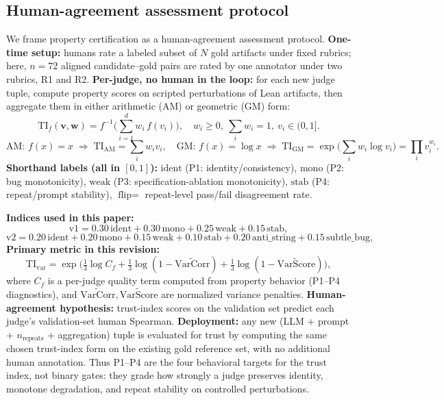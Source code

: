 \documentclass{article}
\begin{document}
\subsection{Human-agreement assessment protocol}
We frame property certification as a human-agreement assessment protocol.
\textbf{One-time setup:} humans rate a labeled subset of \(N\) gold artifacts under fixed rubrics; here, \(n=72\) aligned candidate--gold pairs are rated by one annotator under two rubrics, R1 and R2.
\textbf{Per-judge, no human in the loop:} for each new judge tuple, compute property scores on scripted perturbations of Lean artifacts, then aggregate them in either arithmetic (AM) or geometric (GM) form:
\[
  \mathrm{TI}_{f}(\mathbf{v},\mathbf{w})
  =
  f^{-1}\!\Big(\sum_{i=1}^{d} w_i\, f(v_i)\Big),
  \quad
  w_i\ge 0,\ \sum_i w_i=1,\ v_i\in(0,1].
\]
\[
  \text{AM: } f(x)=x
  \;\Rightarrow\;
  \mathrm{TI}_{\mathrm{AM}}=\sum_i w_i v_i,
  \quad
  \text{GM: } f(x)=\log x
  \;\Rightarrow\;
  \mathrm{TI}_{\mathrm{GM}}=\exp\!\Big(\sum_i w_i\log v_i\Big)=\prod_i v_i^{w_i}.
\]
\textbf{Shorthand labels (all in \([0,1]\)):}
\(\text{ident}\) (P1: identity/consistency),
\(\text{mono}\) (P2: bug monotonicity),
\(\text{weak}\) (P3: specification-ablation monotonicity),
\(\text{stab}\) (P4: repeat/prompt stability),
\(\text{flip}=\) repeat-level pass/fail disagreement rate.

\textbf{Indices used in this paper:}
\[
  \text{v1} = 0.30\,\text{ident} + 0.30\,\text{mono} + 0.25\,\text{weak} + 0.15\,\text{stab},
\]
\[
  \text{v2} = 0.20\,\text{ident} + 0.20\,\text{mono} + 0.15\,\text{weak} + 0.10\,\text{stab} + 0.20\,\text{anti\_string} + 0.15\,\text{subtle\_bug},
\]
\textbf{Primary metric in this revision:}
\[
  \mathrm{TI}_{\mathrm{var}}
  =
  \exp\!\Big(\tfrac{1}{3}\log C_f
  +\tfrac{1}{3}\log(1-\widetilde{\mathrm{VarCorr}})
  +\tfrac{1}{3}\log(1-\widetilde{\mathrm{VarScore}})\Big),
\]
where \(C_f\) is a per-judge quality term computed from property behavior (P1--P4 diagnostics), and \(\widetilde{\mathrm{VarCorr}},\widetilde{\mathrm{VarScore}}\) are normalized variance penalties.
\textbf{Human-agreement hypothesis:} trust-index scores on the validation set predict each judge's validation-set human Spearman.
\textbf{Deployment:} any new (LLM + prompt + \(n_\text{repeats}\) + aggregation) tuple is evaluated for trust by computing the same chosen trust-index form on the existing gold reference set, with no additional human annotation.
Thus P1--P4 are the four behavioral targets for the trust index, not binary gates: they grade how strongly a judge preserves identity, monotone degradation, and repeat stability on controlled perturbations.
\end{document}
